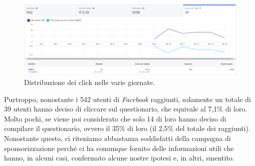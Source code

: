\begin{figure}[!h]
    \centering
    \includegraphics[width=0.9\columnwidth]{assets/images/ricerca-etnografica/post-facebook-statistiche-click}
    \caption{Distribuzione dei click nelle varie giornate.}
\end{figure}
Purtroppo, nonostante i 542 utenti di \textit{Facebook} raggiunti, solamente un totale di 39 utenti hanno deciso di cliccare sul questionario, che equivale al 7,1\% di loro. Molto pochi, se viene poi considerato che solo 14 di loro hanno deciso di compilare il questionario, ovvero il 35\% di loro (il 2,5\% del totale dei raggiunti).\\
Nonostante questo, ci riteniamo abbastanza soddisfatti della campagna di sponsorizzazione perché ci ha comunque fornito delle informazioni utili che hanno, in alcuni casi, confermato alcune nostre ipotesi e, in altri, smentito.

